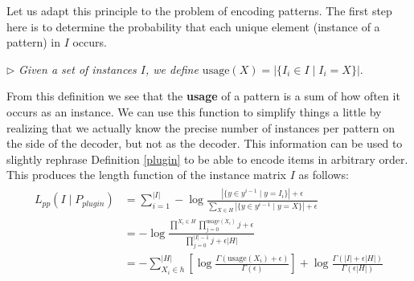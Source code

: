 \documentclass{llncs}
\begin{document}
Let us adapt this principle to the problem of encoding patterns. The first step here is to determine the probability that each unique element (instance of a pattern) in ${I}$ occurs. 

\label{usage}
\smallskip \noindent $\triangleright$
\emph{Given a set of instances ${I}$, we define $\mathrm{usage}(X) = |\{ {I}_i \in {I} \mid {I}_i = X\}|.$}
\smallskip

From this definition we see that the \textbf{usage} of a pattern is a sum of how often it occurs as an instance. We can use this function to simplify things a little by realizing that we actually know the precise number of instances per pattern on the side of the decoder, but not as the decoder. This information can be used to slightly rephrase Definition \ref{plugin} to be able to encode items in arbitrary order. This produces the length function of the instance matrix ${I}$ as follows:
\begin{align}
\begin{split}
	L_{pp}({I}\mid P_{plugin}) &= \sum^{|{I}|}_{i=1} -\log \frac{|\{y \in y^{i-1} \mid y = {I}_i\}| + \epsilon }{\sum_{X \in H}|\{y \in y^{i-1} \mid y = X\}| + \epsilon}\\
	&= -\log \frac{\prod^{X_i\in H} \prod^{\mathrm{usage}(X_i)}_{j=0} j + \epsilon}{\prod^{|{I}|-1}_{j=0} j + \epsilon|H|} \\
	&= -\sum^{|H|}_{X_i \in h} \left[ \log \frac{\Gamma(\mathrm{usage}(X_i)+\epsilon)}{\Gamma(\epsilon)}\right] + \log \frac{\Gamma(|{I}| + \epsilon|H|)}{\Gamma(\epsilon|H|)}
\end{split}
\end{align}

\end{document}
